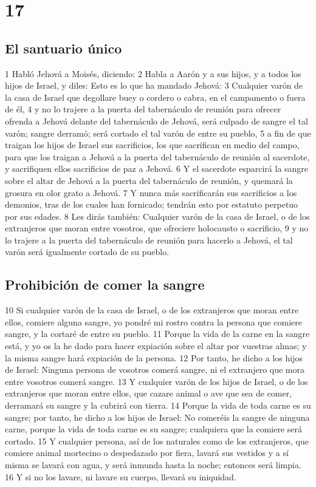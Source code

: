 \chapter{17}

\section{El santuario único}

1 Habló Jehová a Moisés, diciendo:
2 Habla a Aarón y a sus hijos, y a todos los hijos de Israel, y diles: Esto es lo que ha mandado Jehová:
3 Cualquier varón de la casa de Israel que degollare buey o cordero o cabra, en el campamento o fuera de él,
4 y no lo trajere a la puerta del tabernáculo de reunión para ofrecer ofrenda a Jehová delante del tabernáculo de Jehová, será culpado de sangre el tal varón; sangre derramó; será cortado el tal varón de entre su pueblo,
5 a fin de que traigan los hijos de Israel sus sacrificios, los que sacrifican en medio del campo, para que los traigan a Jehová a la puerta del tabernáculo de reunión al sacerdote, y sacrifiquen ellos sacrificios de paz a Jehová.
6 Y el sacerdote esparcirá la sangre sobre el altar de Jehová a la puerta del tabernáculo de reunión, y quemará la grosura en olor grato a Jehová.
7 Y nunca más sacrificarán sus sacrificios a los demonios, tras de los cuales han fornicado; tendrán esto por estatuto perpetuo por sus edades.
8 Les dirás también: Cualquier varón de la casa de Israel, o de los extranjeros que moran entre vosotros, que ofreciere holocausto o sacrificio,
9 y no lo trajere a la puerta del tabernáculo de reunión para hacerlo a Jehová, el tal varón será igualmente cortado de su pueblo. 

\section{Prohibición de comer la sangre}

10 Si cualquier varón de la casa de Israel, o de los extranjeros que moran entre ellos, comiere alguna sangre, yo pondré mi rostro contra la persona que comiere sangre, y la cortaré de entre su pueblo.
11 Porque la vida de la carne en la sangre está, y yo os la he dado para hacer expiación sobre el altar por vuestras almas; y la misma sangre hará expiación de la persona.
12 Por tanto, he dicho a los hijos de Israel: Ninguna persona de vosotros comerá sangre, ni el extranjero que mora entre vosotros comerá sangre.
13 Y cualquier varón de los hijos de Israel, o de los extranjeros que moran entre ellos, que cazare animal o ave que sea de comer, derramará su sangre y la cubrirá con tierra.
14 Porque la vida de toda carne es su sangre; por tanto, he dicho a los hijos de Israel: No comeréis la sangre de ninguna carne, porque la vida de toda carne es su sangre; cualquiera que la comiere será cortado.
15 Y cualquier persona, así de los naturales como de los extranjeros, que comiere animal mortecino o despedazado por fiera, lavará sus vestidos y a sí misma se lavará con agua, y será inmunda hasta la noche; entonces será limpia.
16 Y si no los lavare, ni lavare su cuerpo, llevará su iniquidad.  

